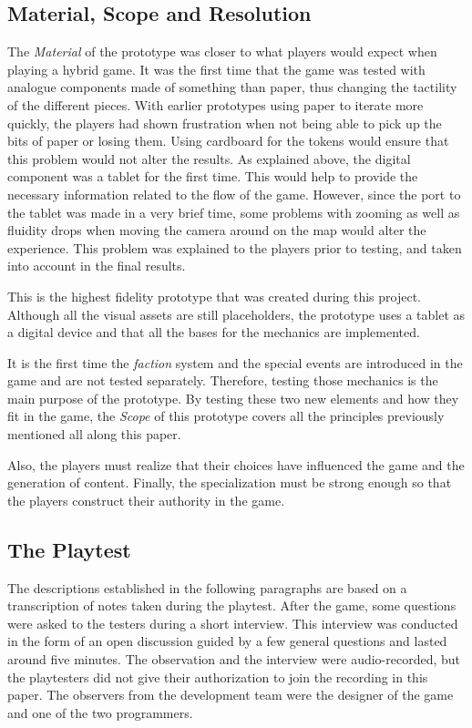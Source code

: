 \subsection{Material, Scope and Resolution}
The \textit{Material} of the prototype was closer to what players would expect when playing a hybrid game. It was the first time that the game was tested with analogue components made of something than paper, thus changing the tactility of the different pieces. With earlier prototypes using paper to iterate more quickly, the players had shown frustration when not being able to pick up the bits of paper or losing them. Using cardboard for the tokens would ensure that this problem would not alter the results. As explained above, the digital component was a tablet for the first time. This would help to provide the necessary information related to the flow of the game. However, since the port to the tablet was made in a very brief time, some problems with zooming as well as fluidity drops when moving the camera around on the map would alter the experience. This problem was explained to the players prior to testing, and taken into account in the final results.

This is the highest fidelity prototype that was created during this project. Although all the visual assets are still placeholders, the prototype uses a tablet as a digital device and that all the bases for the mechanics are implemented. 

It is the first time the \textit{faction} system and the special events are introduced in the game and are not tested separately. Therefore, testing those mechanics is the main purpose of the prototype. By testing these two new elements and how they fit in the game, the \textit{Scope} of this prototype covers all the principles previously mentioned all along this paper. 

Also, the players must realize that their choices have influenced the game and the generation of content. Finally, the specialization must be strong enough so that the players construct their authority in the game. 

\subsection{The Playtest}
The descriptions established in the following paragraphs are based on a transcription of notes taken during the playtest. After the game, some questions were asked to the testers during a short interview. This interview was conducted in the form of an open discussion guided by a few general questions and lasted around five minutes. The observation and the interview were audio-recorded, but the playtesters did not give their authorization to join the recording in this paper. The observers from the development team were the designer of the game and one of the two programmers.

